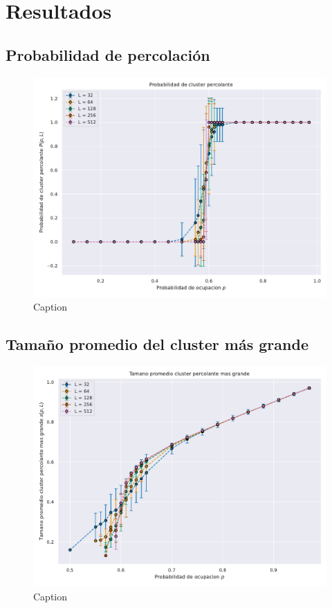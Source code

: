 \documentclass[%
 reprint,
 amsmath,amssymb,
 aps,
]{revtex4-2}
\begin{document}
\section{Resultados}

\subsection{Probabilidad de percolación}

\begin{figure}[H]
    \centering
    \includegraphics[width=1\linewidth]{ProbabilidadCluster.pdf}
    \caption{Caption}
    \label{fig:enter-label}
\end{figure}

\subsection{Tamaño promedio del cluster más grande}

\begin{figure}[H]
    \centering
    \includegraphics[width=1\linewidth]{TamanoCluster.pdf}
    \caption{Caption}
    \label{fig:enter-label}
\end{figure}
\end{document}
